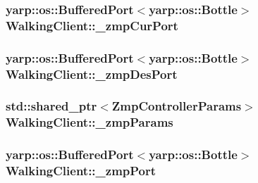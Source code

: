 \hypertarget{classWalkingClient_a546e6830e43d19ba7d8a8e808e28ef53}{
\subsubsection[{\-\_\-zmp\-Cur\-Port}]{\setlength{\rightskip}{0pt plus 5cm}yarp\-::os\-::\-Buffered\-Port$<$yarp\-::os\-::\-Bottle$>$ {\bf \-Walking\-Client\-::\-\_\-zmp\-Cur\-Port}}}\label{classWalkingClient_a546e6830e43d19ba7d8a8e808e28ef53}
\hypertarget{classWalkingClient_acbac3e142471448b50dd605e4217b0d0}{
\subsubsection[{\-\_\-zmp\-Des\-Port}]{\setlength{\rightskip}{0pt plus 5cm}yarp\-::os\-::\-Buffered\-Port$<$yarp\-::os\-::\-Bottle$>$ {\bf \-Walking\-Client\-::\-\_\-zmp\-Des\-Port}}}\label{classWalkingClient_acbac3e142471448b50dd605e4217b0d0}
\hypertarget{classWalkingClient_a20012b4bee7f6de8177ed53907f894cb}{
\subsubsection[{\-\_\-zmp\-Params}]{\setlength{\rightskip}{0pt plus 5cm}std\-::shared\-\_\-ptr$<${\bf \-Zmp\-Controller\-Params}$>$ {\bf \-Walking\-Client\-::\-\_\-zmp\-Params}}}\label{classWalkingClient_a20012b4bee7f6de8177ed53907f894cb}
\hypertarget{classWalkingClient_af2e0817fa94ca802775addd22b09bf7a}{
\subsubsection[{\-\_\-zmp\-Port}]{\setlength{\rightskip}{0pt plus 5cm}yarp\-::os\-::\-Buffered\-Port$<$yarp\-::os\-::\-Bottle$>$ {\bf \-Walking\-Client\-::\-\_\-zmp\-Port}}}\label{classWalkingClient_af2e0817fa94ca802775addd22b09bf7a}
